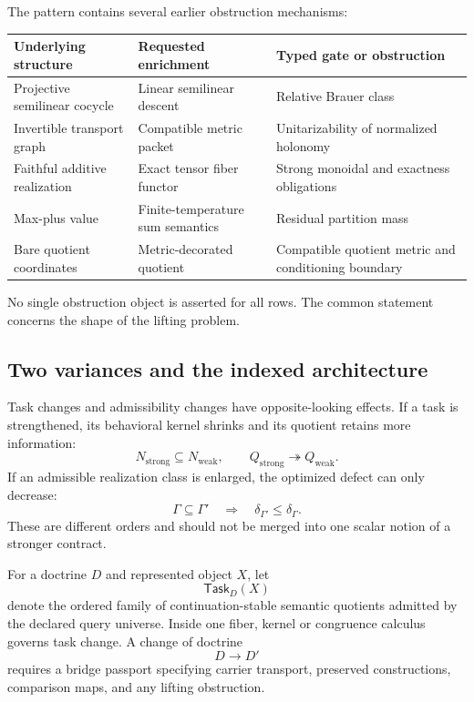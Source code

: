 The pattern contains several earlier obstruction mechanisms:
\begin{center}
\small
\begin{tabularx}{.96\textwidth}{@{}L{.26\textwidth}L{.28\textwidth}Y@{}}
\toprule
Underlying structure & Requested enrichment & Typed gate or obstruction\\
\midrule
Projective semilinear cocycle & Linear semilinear descent & Relative Brauer class\\
Invertible transport graph & Compatible metric packet & Unitarizability of normalized holonomy\\
Faithful additive realization & Exact tensor fiber functor & Strong monoidal and exactness obligations\\
Max-plus value & Finite-temperature sum semantics & Residual partition mass\\
Bare quotient coordinates & Metric-decorated quotient & Compatible quotient metric and conditioning boundary\\
\bottomrule
\end{tabularx}
\end{center}
No single obstruction object is asserted for all rows.  The common statement concerns the shape of the lifting problem.

\subsection{Two variances and the indexed architecture}
\label{subsec:block19-indexed-architecture}

Task changes and admissibility changes have opposite-looking effects.  If a task is strengthened, its behavioral kernel shrinks and its quotient retains more information:
\[
 N_{\mathrm{strong}}\subseteq N_{\mathrm{weak}},
 \qquad
 Q_{\mathrm{strong}}\twoheadrightarrow Q_{\mathrm{weak}}.
\]
If an admissible realization class is enlarged, the optimized defect can only decrease:
\[
 \Gamma\subseteq\Gamma'
 \quad\Longrightarrow\quad
 \delta_{\Gamma'}\leq\delta_\Gamma.
\]
These are different orders and should not be merged into one scalar notion of a stronger contract.

\begin{definition}
\label{def:block19-task-fiber}
For a doctrine \(D\) and represented object \(X\), let
\[
 \mathsf{Task}_D(X)
\]
denote the ordered family of continuation-stable semantic quotients admitted by the declared query universe.  Inside one fiber, kernel or congruence calculus governs task change.  A change of doctrine
\[
 D\longrightarrow D'
\]
requires a bridge passport specifying carrier transport, preserved constructions, comparison maps, and any lifting obstruction.
\end{definition}

